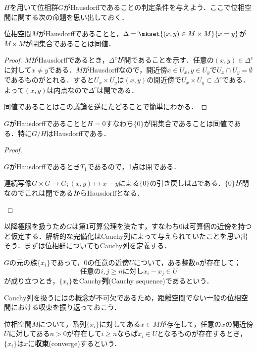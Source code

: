 $H$を用いて位相群$G$がHausdorffであることの判定条件を与えよう．ここで位相空間に関する次の命題を思い出しておく．

\begin{prop}\label{prop:Hausdorffと対角線}
	位相空間$M$がHausdorffであることと，$\Delta=\mkset{(x,y)\in M\times M}{x=y}$が$M\times M$が閉集合であることは同値．
\end{prop}
\begin{proof}
	$M$がHausdorffであるとき，$\Delta^c$が開であることを示す．任意の$(x,y)\in\Delta^c$に対して$x\neq y$である．$M$がHausdorffなので，開近傍$x\in U_x,y\in U_y$で$U_x\cap U_y=\emptyset$であるものがとれる．すると$U_x\times U_y$は$(x,y)$の開近傍で$U_x\times U_y\subset\Delta^c$である．よって$(x,y)$は内点なので$\Delta^c$は開である．
	
	同値であることはこの議論を逆にたどることで簡単にわかる．
\end{proof}

\begin{prop}\label{prop:位相群がHdfになる条件}
	$G$がHausdorffであることと$H=0$すなわち$\{0\}$が閉集合であることは同値である．特に$G/H$はHausdorffである．
\end{prop}

\begin{proof}
	\begin{eqv}
		\item $G$がHausdorffであるとき$T_1$であるので，1点は閉である．
		\item 連続写像$G\times G\to G;(x,y)\mapsto x-y$による$\{0\}$の引き戻しは$\Delta$である．$\{0\}$が閉なのでこれは閉であるからHausdorffとなる．
	\end{eqv}
\end{proof}

以降極限を扱うため$G$は第1可算公理を満たす，すなわち$0$は可算個の近傍を持つと仮定する．解析的な完備化はCauchy列によって与えられていたことを思い出そう．まずは位相群についてもCauchy列を定義する．

\begin{defi}[Cauchy列]
	$G$の元の族$\{x_i\}$であって，$0$の任意の近傍$U$について，ある整数$n$が存在して；
	\[\text{任意の}i,j\geq n\text{に対し} x_i-x_j\in U\]
	が成り立つとき，$\{x_i\}$をCauchy\textbf{列}(Cauchy sequence)であるという．
\end{defi}

Cauchy列を扱うにはの概念が不可欠であるため，距離空間でない一般の位相空間における収束を振り返っておこう．

\begin{defi}[収束]
	位相空間$M$について，系列$\{x_i\}$に対してある$x\in M$が存在して，任意の$x$の開近傍$U$に対してある$n>0$が存在して$i\geq n$ならば$x_i\in U$となるものが存在するとき，$\{x_i\}$は$x$に\textbf{収束}(converge)するという．
\end{defi}

